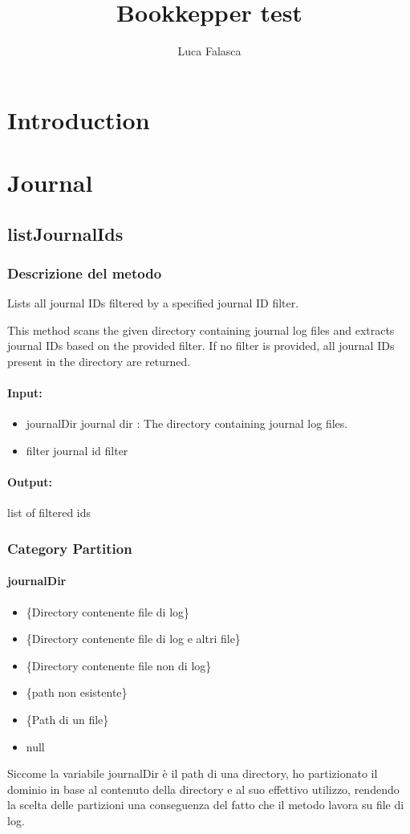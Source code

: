 \documentclass[12pt, a4paper]{article}
\title{Bookkepper test}
\author{Luca Falasca}
\begin{document}
\maketitle
\tableofcontents
\newpage

\section{Introduction}

\section{Journal}
\subsection{listJournalIds}
\subsubsection{Descrizione del metodo}
Lists all journal IDs filtered by a specified journal ID filter.

This method scans the given directory containing journal log files and extracts
journal IDs based on the provided filter. If no filter is provided, all journal
IDs present in the directory are returned.


\paragraph{Input:}
\begin{itemize}
  \item journalDir journal dir : The directory containing journal log files.
  \item filter journal id filter
\end{itemize}
\paragraph{Output:}
    list of filtered ids

\subsubsection{Category Partition}
\paragraph{journalDir}
\begin{itemize}
  \item \{Directory contenente file di log\}
  \item \{Directory contenente file di log e altri file\}
  \item \{Directory contenente file non di log\}
  \item \{path non esistente\}
  \item \{Path di un file\}
  \item null
\end{itemize}
Siccome la variabile journalDir è il path di una directory, ho partizionato 
il dominio in base al contenuto della directory e al suo effettivo utilizzo, rendendo la scelta delle partizioni 
una conseguenza del fatto che il metodo lavora su file di log.
\end{document}
